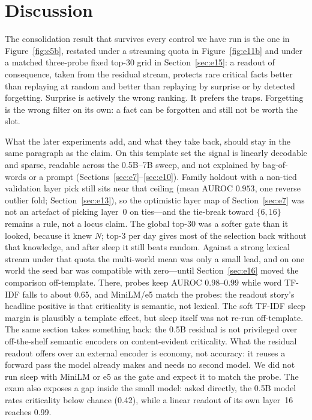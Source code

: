 \documentclass[11pt,a4paper]{article}
\begin{document}
\section{Discussion}

The consolidation result that survives every control we have run is the one in Figure~\ref{fig:e5b}, restated under a streaming quota in Figure~\ref{fig:e11b} and under a matched three-probe fixed top-30 grid in Section~\ref{sec:e15}: a readout of consequence, taken from the residual stream, protects rare critical facts better than replaying at random and better than replaying by surprise or by detected forgetting.
Surprise is actively the wrong ranking.
It prefers the traps.
Forgetting is the wrong filter on its own: a fact can be forgotten and still not be worth the slot.

What the later experiments add, and what they take back, should stay in the same paragraph as the claim.
On this template set the signal is linearly decodable and sparse, readable across the 0.5B--7B sweep, and not explained by bag-of-words or a prompt (Sections~\ref{sec:e7}--\ref{sec:e10}).
Family holdout with a non-tied validation layer pick still sits near that ceiling (mean AUROC $0.953$, one reverse outlier fold; Section~\ref{sec:e13}), so the optimistic layer map of Section~\ref{sec:e7} was not an artefact of picking layer~0 on ties---and the tie-break toward $\{6,16\}$ remains a rule, not a locus claim.
The global top-30 was a softer gate than it looked, because it knew $N$; top-3 per day gives most of the selection back without that knowledge, and after sleep it still beats random.
Against a strong lexical stream under that quota the multi-world mean was only a small lead, and on one world the seed bar was compatible with zero---until Section~\ref{sec:e16} moved the comparison off-template.
There, probes keep AUROC 0.98--0.99 while word TF-IDF falls to about 0.65, and MiniLM/e5 match the probes: the readout story's headline positive is that criticality is semantic, not lexical. The soft TF-IDF sleep margin is plausibly a template effect, but sleep itself was not re-run off-template.
The same section takes something back: the 0.5B residual is not privileged over off-the-shelf semantic encoders on content-evident criticality.
What the residual readout offers over an external encoder is economy, not accuracy: it reuses a forward pass the model already makes and needs no second model. We did not run sleep with MiniLM or e5 as the gate and expect it to match the probe. The exam also exposes a gap inside the small model: asked directly, the 0.5B model rates criticality below chance (0.42), while a linear readout of its own layer~16 reaches 0.99.
\end{document}
